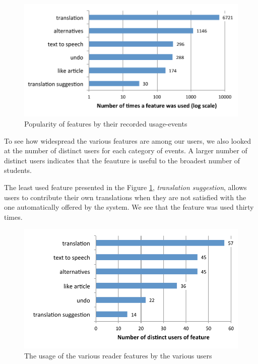 \begin{figure}[h!]
\centering
  \includegraphics[width=0.9\columnwidth]{figures/reader_feature_usage}
  \caption{Popularity of features by their recorded usage-events}
  \label{fig:feature_usage}
\end{figure}


To see how widespread the various features are among our users, we also looked at the number of distinct users for each category of events. A larger number of distinct users indicates that the feauture is useful to the broadest number of students.

The least used feature presented in the Figure \ref{fig:feature_usage}, {\em translation suggestion}, allows users to contribute their own translations when they are not satisfied with the one automatically offered by the system. We see that the feature was used thirty times.  

\begin{figure}[h!]
\centering
  \includegraphics[width=0.9\columnwidth]{figures/reader_feature_usage_per_user}
  \caption{The usage of the various reader features by the various users }
  \label{fig:usage_per_user}
\end{figure}

